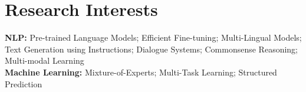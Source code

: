 \section{\mysidestyle Research Interests}
\vspace{0mm}
\textbf{NLP:} Pre-trained Language Models; Efficient Fine-tuning; Multi-Lingual Models; Text Generation using Instructions; Dialogue Systems; Commonsense Reasoning; Multi-modal Learning \\
\textbf{Machine Learning:} Mixture-of-Experts; Multi-Task Learning; Structured Prediction